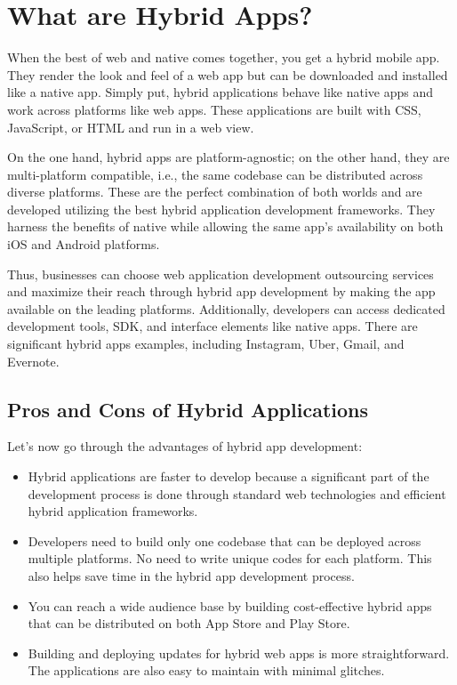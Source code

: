 \documentclass[conference]{IEEEtran}
\begin{document}
\section{What are Hybrid Apps?}
When the best of web and native comes together, you get a hybrid mobile app. They render the look and feel of a web app but can be downloaded and installed like a native app. Simply put, hybrid applications behave like native apps and work across platforms like web apps. These applications are built with CSS, JavaScript, or HTML and run in a web view.

On the one hand, hybrid apps are platform-agnostic; on the other hand, they are multi-platform compatible, i.e., the same codebase can be distributed across diverse platforms. These are the perfect combination of both worlds and are developed utilizing the best hybrid application development frameworks. They harness the benefits of native while allowing the same app's availability on both iOS and Android platforms.

Thus, businesses can choose web application development outsourcing services and maximize their reach through hybrid app development by making the app available on the leading platforms. Additionally, developers can access dedicated development tools, SDK, and interface elements like native apps. There are significant hybrid apps examples, including Instagram, Uber, Gmail, and Evernote.

\subsection{Pros and Cons of Hybrid Applications}
Let's now go through the advantages of hybrid app development:

\begin{itemize}
    \item Hybrid applications are faster to develop because a significant part of the development process is done through standard web technologies and efficient hybrid application frameworks.
    \item Developers need to build only one codebase that can be deployed across multiple platforms. No need to write unique codes for each platform. This also helps save time in the hybrid app development process.
    \item You can reach a wide audience base by building cost-effective hybrid apps that can be distributed on both App Store and Play Store.
    \item Building and deploying updates for hybrid web apps is more straightforward. The applications are also easy to maintain with minimal glitches.
\end{itemize}
\end{document}
